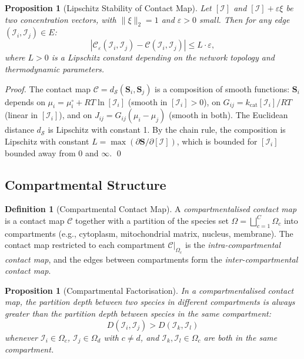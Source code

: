 \documentclass[11pt,twocolumn]{article}
\theoremstyle{plain}
\newtheorem{proposition}[theorem]{Proposition}
\theoremstyle{definition}
\newtheorem{definition}[theorem]{Definition}
\newcommand{\CC}{\mathcal{C}}
\newcommand{\bS}{\mathbf{S}}
\newcommand{\dS}{d_{\mathcal{S}}}
\newcommand{\eps}{\varepsilon}
\begin{document}
\begin{proposition}[Lipschitz Stability of Contact Map]
\label{prop:stability}
Let $[\mathcal{I}]$ and $[\mathcal{I}] + \eps \xi$ be two concentration vectors,
with $\|\xi\|_2 = 1$ and $\eps > 0$ small. Then for any edge
$(\mathcal{I}_i, \mathcal{I}_j) \in E$:
\begin{equation}
  |\CC_\eps(\mathcal{I}_i, \mathcal{I}_j)
  - \CC(\mathcal{I}_i, \mathcal{I}_j)|
  \leq L \cdot \eps,
\end{equation}
where $L > 0$ is a Lipschitz constant depending on the network topology and
thermodynamic parameters.
\end{proposition}

\begin{proof}
The contact map $\CC = \dS(\bS_i, \bS_j)$ is a composition of smooth functions:
$\bS_i$ depends on $\mu_i = \mu_i^\circ + RT \ln[\mathcal{I}_i]$ (smooth in
$[\mathcal{I}_i] > 0$), on $G_{ij} = k_{\text{cat}} [\mathcal{I}_i] / RT$
(linear in $[\mathcal{I}_i]$), and on $J_{ij} = G_{ij}(\mu_i - \mu_j)$ (smooth
in both). The Euclidean distance $\dS$ is Lipschitz with constant 1. By the
chain rule, the composition is Lipschitz with constant $L = \max(\partial \bS /
\partial [\mathcal{I}])$, which is bounded for $[\mathcal{I}_i]$ bounded away
from 0 and $\infty$. \qed
\end{proof}

\subsection{Compartmental Structure}

\begin{definition}[Compartmental Contact Map]
\label{def:compartmental}
A \emph{compartmentalised contact map} is a contact map $\CC$ together with a
partition of the species set $\Omega = \bigsqcup_{c=1}^C \Omega_c$ into
compartments (e.g., cytoplasm, mitochondrial matrix, nucleus, membrane).
The contact map restricted to each compartment $\CC|_{\Omega_c}$ is the
\emph{intra-compartmental contact map}, and the edges between compartments
form the \emph{inter-compartmental contact map}.
\end{definition}

\begin{proposition}[Compartmental Factorisation]
\label{prop:factorisation}
In a compartmentalised contact map, the partition depth between two species in
different compartments is always greater than the partition depth between species
in the same compartment:
\begin{equation}
  D(\mathcal{I}_i, \mathcal{I}_j) > D(\mathcal{I}_k, \mathcal{I}_l)
\end{equation}
whenever $\mathcal{I}_i \in \Omega_c$, $\mathcal{I}_j \in \Omega_d$ with $c
\neq d$, and $\mathcal{I}_k, \mathcal{I}_l \in \Omega_c$ are both in the same
compartment.
\end{proposition}
\end{document}
